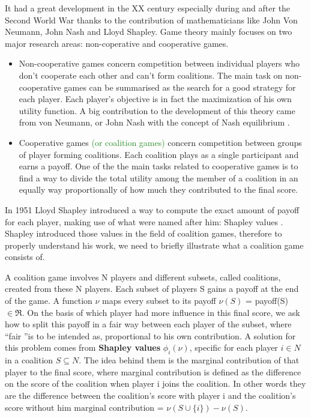 \documentclass[11pt]{report}
\begin{document}
It had a great development in the XX century especially during and after the Second World War thanks to the contribution of mathematicians like John Von Neumann, John Nash and Lloyd Shapley.
Game theory mainly focuses on two major research areas: non-coperative and cooperative games.
\begin{itemize}
\item Non-cooperative games concern competition between individual players who don't cooperate each other and can't form coalitions. The main task on non-cooperative games can be summarised as the search for a good strategy for each player. Each player's objective is in fact the maximization of his own utility function.
A big contribution to the development of this theory came from von Neumann, or John Nash with the concept of Nash equilibrium \cite{nash-1950}.

\item Cooperative games \textcolor{ForestGreen}{(or coalition games)} concern competition between groups of player forming coalitions.
Each coalition plays as a single participant and earns a payoff.
One of the the main tasks related to cooperative games is to find a way to divide the total utility among the member of a coalition in an equally way proportionally of how much they contributed to the final score.
\end{itemize}
In 1951 Lloyd Shapley introduced a way to compute the exact amount of payoff for each player, making use of what were named after him: Shapley values \cite{shapley1951-I}\cite{shapley1953}.
Shapley introduced those values in the field of coalition games, therefore to properly understand his work, we need to briefly illustrate what a coalition game consists of.

A coalition game involves N players and different subsets, called coalitions, created from these N players.
Each subset of players S gains a payoff at the end of the game.
A function $\nu$ maps every subset to its payoff $\nu(S)$ = payoff(S) $\in \Re$.
On the basis of which player had more influence in this final score, we ask how to split this payoff in a fair way between each player of the subset, where \textquotedblleft fair \textquotedblright is to be intended as, proportional to his own contribution.
A solution for this problem comes from \textbf{Shapley values} $\phi_i(\nu)$, specific for each player $i\in N$  in a coalition $S \subseteq N$.
The idea behind them is the marginal contribution of that player to the final score, where marginal contribution is defined as the difference on the score of the coalition when player i joins the coalition.
In other words they are the difference between the coalition's score with player i and the coalition's score without him $\text{marginal contribution = }\nu (S \cup \{ i \}) - \nu(S)$. \cite{algaba-2021}
\end{document}
